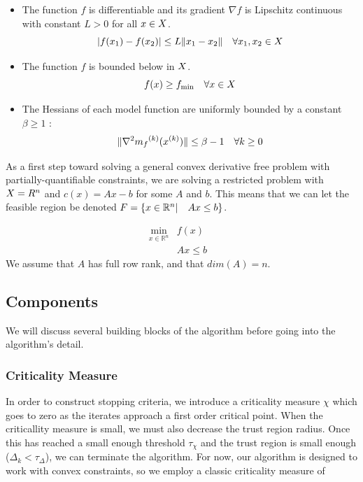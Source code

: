 \begin{itemize}
\item The function $f$ is differentiable and its gradient $\nabla f$ is Lipschitz continuous with constant $L > 0$ for all $x \in X$.
\begin{equation}
\label{A1}
|f(x_1) - f(x_2)| \le L \|x_1 - x_2\| \quad \forall x_1, x_2 \in X
\end{equation}
\item \label{A2} The function $f$ is bounded below in $X$.
\begin{equation}
\label{A2}
f(x) \ge f_{\text{min}} \quad \forall x \in X
\end{equation}

\item The Hessians of each model function are uniformly bounded by a constant $\beta \ge 1$ :
\begin{equation}
\label{A3}
\|\nabla^2 {{m}_f}^{(k)}({x}^{(k)})\| \le \beta - 1 \quad \forall k \ge 0
\end{equation}

\end{itemize}

As a first step toward solving a general convex derivative free problem with partially-quantifiable constraints,
we are solving a restricted problem with $X = R^n$ and $c(x) = Ax-b$ for some $A$ and $b$.
This means that we can let the feasible region be denoted ${F} = \{x \in \mathbb R^n | \quad  Ax \le b \}$.

\[ \begin{array}{ccl} \min_{x \in \mathbb R^n} & f(x) \\
& Ax \le b & 
\end{array}
\]
We assume that $A$ has full row rank, and that  $dim(A) = n$.



\subsection{Components}

We will discuss several building blocks of the algorithm before going into the algorithm's detail.


\subsubsection{Criticality Measure}

In order to construct stopping criteria, we introduce a criticality measure $\chi$ which goes to zero as the iterates approach a first order critical point.
When the criticallity measure is small, we must also decrease the trust region radius.
Once this has reached a small enough threshold $\tau_{\chi}$ and the trust region is small enough ($\Delta_k < \tau_{\Delta}$), we can terminate the algorithm.
For now, our algorithm is designed to work with convex constraints, so we employ a classic criticality measure of


